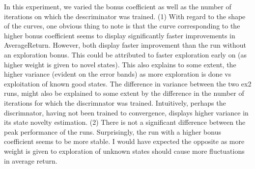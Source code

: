 \documentclass[a4paper]{article}
\begin{document}
In this experiment, we varied the bonus coefficient as well as the number of iterations on which the descriminator was trained. (1) With regard to the shape of the curves, one obvious thing to note is that the curve corresponding to the higher bonus coefficient seems to display significantly faster improvements in AverageReturn. However, both display faster improvement than the run without an exploration bonus. This could be attributed to faster exploration early on (as higher weight is given to novel states). This also explains to some extent, the higher variance (evident on the error bands) as more exploration is done vs exploitation of known good states. The difference in variance between the two ex2 runs, might also be explained to some extent by the difference in the number of iterations for which the discrimnator was trained. Intuitively, perhaps the discrimnator, having not been trained to convergence, displays higher variance in its state novelty estimation. (2) There is not a significant difference between the peak performance of the runs. Surprisingly, the run with a higher bonus coefficient seems to be more stable. I would have expected the opposite as more weight is given to exploration of unknown states should cause more fluctuations in average return.
\end{document}
